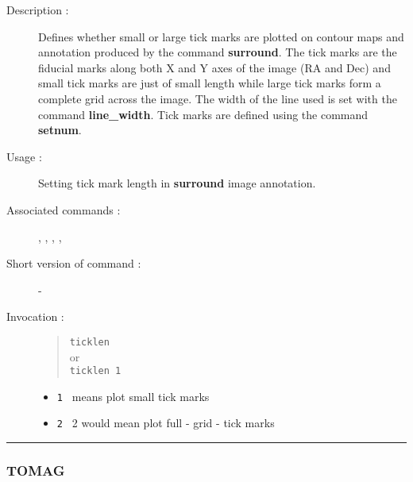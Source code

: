 \begin{description}

\item[Description :] Defines whether small or large tick marks are
plotted on contour maps and annotation produced by the command {\bf
surround}.  The tick marks are the fiducial marks along both X and Y
axes of the image (RA and Dec) and small tick marks are just of small
length while large tick marks form a complete grid across the image.
The width of the line used is set with the command {\bf line\_width}.
Tick marks are defined using the command {\bf setnum}.

\item[Usage :] Setting tick mark length in {\bf surround} image annotation.

\item[Associated commands :] {\tt {}},
{\tt {}}, {\tt {}},
{\tt {}}, {\tt {}}

\item[Short version of command :] -
\item[Invocation :]

\begin{quote}{\tt  ticklen }\\
or \\
{\tt ticklen 1 }
\end{quote}

\begin{itemize}

\item {\tt 1 } means plot small tick marks
\item {\tt 2 } 2 would mean plot full - grid - tick marks
\end{itemize}

\end{description}

\hrule
\subsubsection*{\label{TOMAG}TOMAG}

